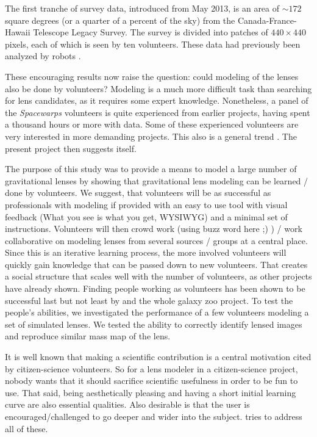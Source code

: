 The first tranche of survey data, introduced from May 2013, is an area
of $\sim172$ square degrees (or a quarter of a percent of the sky)
from the Canada-France-Hawaii Telescope Legacy Survey.  The survey is
divided into patches of $440\times 440$ pixels, each of which is seen
by ten volunteers.  These data had previously been analyzed by robots
\cite{Gavazzi2012, More2012ApJ}.

These encouraging results now raise the question: could modeling of
the lenses also be done by volunteers?  Modeling is a much more
difficult task than searching for lens candidates, as it requires some
expert knowledge.  Nonetheless, a panel of the {\em Spacewarps\/}
volunteers is quite experienced from earlier projects, having spent a
thousand hours or more with data.  Some of these experienced
volunteers are very interested in more demanding projects.  This also
is a general trend \citep[cf.][]{Khatib22112011}.  The present project
then suggests itself.

The purpose of this study was to provide a means to model a large number of gravitational lenses by showing that gravitational lens modeling can be learned / done by volunteers.
We suggest, that volunteers will be as successful as professionals with modeling if provided with an easy to use tool with visual feedback (What you see is what you get, WYSIWYG) and a minimal set of instructions.
Volunteers will then crowd work (using buzz word here ;) ) / work collaborative on modeling lenses from several sources / groups at a central place.
Since this is an iterative learning process, the more involved volunteers will quickly gain knowledge that can be passed down to new volunteers.
That creates a social structure that scales well with the number of volunteers, as other projects have already shown. %
Finding people working as volunteers has been shown to be successful last but not least by \sw and the whole galaxy zoo project.
To test the people's abilities, we investigated the performance of a few volunteers modeling a set of simulated lenses.
We tested the ability to correctly identify lensed images and reproduce similar mass map of the lens.

It is well known that making a scientific contribution is a central
motivation cited by citizen-science volunteers.  So for a lens
modeler in a citizen-science project, nobody wants that it should
sacrifice scientific usefulness in order to be fun to use.  That said,
being aesthetically pleasing and having a short initial learning curve
are also essential qualities.  Also desirable is that the user is
encouraged/challenged to go deeper and wider into the subject.
  \spl tries to address all of these.

